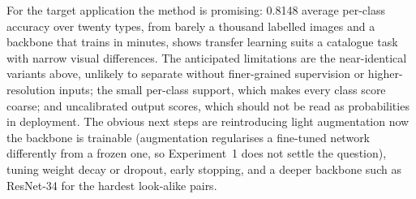 \documentclass[10pt,a4paper,twocolumn]{article}
\begin{document}
For the target application the method is promising: 0.8148 average per-class accuracy over twenty
types, from barely a thousand labelled images and a backbone that trains in minutes, shows transfer
learning suits a catalogue task with narrow visual differences. The anticipated limitations are the
near-identical variants above, unlikely to separate without finer-grained supervision or
higher-resolution inputs; the small per-class support, which makes every class score coarse; and
uncalibrated output scores, which should not be read as probabilities in deployment. The obvious
next steps are reintroducing light augmentation now the backbone is trainable (augmentation
regularises a fine-tuned network differently from a frozen one, so Experiment~1 does not settle the
question), tuning weight decay or dropout, early stopping, and a deeper backbone such as
ResNet-34 for the hardest look-alike pairs.
\end{document}
